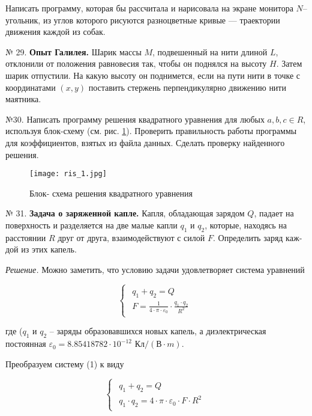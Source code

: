 Написать программу, которая бы рассчитала и нарисовала на экране монитора $N$--угольник, из углов которого рисуются разноцветные кривые --- траектории движения каждой из собак.

№ 29. {\bf Опыт Галилея.}
Шарик массы $M$, подвешенный на нити длиной $L$, отклонили от положения равновесия так, чтобы он поднялся на высоту $H$. Затем шарик отпустили. На какую высоту он поднимется, если на пути нити в точке с координатами $(x, y)$ поставить стержень перпендикулярно движению нити маятника.

№30. Написать программу решения квадратного уравнения для любых $a,b,c \in R$, используя блок-схему (см. рис. \ref{ris1}). Проверить правильность работы программы для коэффициентов, взятых из файла данных. Сделать проверку найденного решения.

\begin{figure}[!hb]
\centerline{\texttt{[image: ris\_1.jpg]}}
\caption{Блок- схема решения квадратного уравнения}
\label{ris1}
\end{figure}

№ 31. {\bf Задача о заряженной капле.}
Капля, обладающая зарядом $Q$, падает на поверхность и раз­деляется на две малые капли $q_1$ и $q_2$, которые, находясь на расстоянии $R$ друг от друга, взаимодействуют с силой $F$. Определить заряд каж­дой из этих капель.

{\it Решение.} Можно заметить, что условию задачи удовлетворяет система уравнений

\begin{equation}
 \begin{cases}
 \begin{aligned}
   q_1 + q_2 = Q\\
   F = \frac{1}{4\cdot\pi\cdot\varepsilon_0}\cdot\frac{q_1\cdot q_2}{R^2}
   \end{aligned}
 \end{cases}
\end{equation}

где ($q_1$ и $q_2$ -- заряды образовавшихся новых капель, 
а диэлектрическая постоянная
 $\varepsilon_0=8.85418782\cdot 10^{-12}$ $\text{Кл}/(\text{В}\cdot m).$

Преобразуем систему (1) к виду  

\begin{equation}
 \begin{cases}
 \begin{aligned}
   q_1 + q_2 = Q\\
   q_1\cdot q_2 = {4\cdot\pi\cdot\varepsilon_0}\cdot F\cdot R^2
      \end{aligned}
 \end{cases}
\end{equation}

